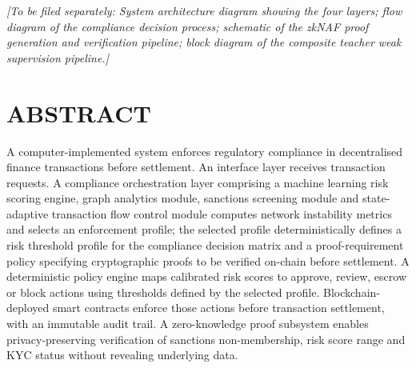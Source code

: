 \documentclass[12pt,a4paper]{article}
\begin{document}
\textit{[To be filed separately: System architecture diagram showing the 
four layers; flow diagram of the compliance decision process; schematic of 
the zkNAF proof generation and verification pipeline; block diagram of the 
composite teacher weak supervision pipeline.]}

\newpage
\section*{ABSTRACT}

A computer-implemented system enforces regulatory compliance in decentralised
finance transactions before settlement. An interface layer receives
transaction requests. A compliance orchestration layer comprising a machine
learning risk scoring engine, graph analytics module, sanctions screening
module and state-adaptive transaction flow control module computes network
instability metrics and selects an enforcement profile; the selected profile
deterministically defines a risk threshold profile for the compliance decision
matrix and a proof-requirement policy specifying cryptographic proofs to be
verified on-chain before settlement. A deterministic policy engine maps
calibrated risk scores to approve, review, escrow or block actions using
thresholds defined by the selected profile. Blockchain-deployed smart
contracts enforce those actions before transaction settlement, with an
immutable audit trail. A zero-knowledge proof subsystem enables
privacy-preserving verification of sanctions non-membership, risk score range
and KYC status without revealing underlying data.
\end{document}
